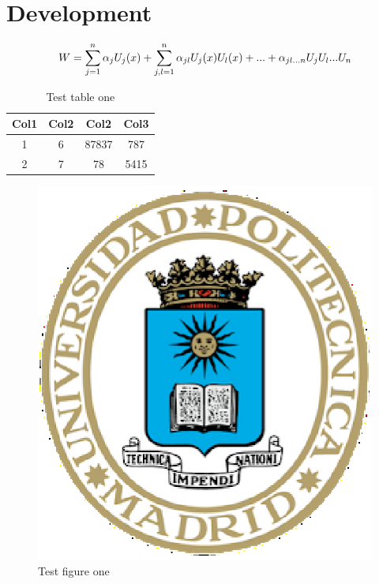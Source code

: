 \section{Development}
    
    \vspace{0.3cm}
    \noindent
    \begin{equation}
        W = \sum_{j=1}^{n} \alpha_j U_j(x) + \sum_{j,l=1}^{n} \alpha_{jl} U_j(x) U_l(x) + ... + \alpha_{jl...n} U_j U_l ... U_n
        \label{equation:eq_one}
        \myequations{Test equation one}
    \end{equation}
    \vspace{0.3cm}
    
    \noindent
    \begin{table}[h!]
        \centering
        \begin{tabular}{||c c c c||} 
            \hline
            Col1 & Col2 & Col2 & Col3 \\ [0.5ex] 
            \hline\hline
            1 & 6 & 87837 & 787 \\ 
            \hline
            2 & 7 & 78 & 5415 \\
            \hline
        \end{tabular}
        
        \caption{Test table one}
        \label{table:table_one}
    \end{table}
    
    \noindent
    \begin{figure}[h!]
        \centering
        \includegraphics[scale=0.2]{images/UPM.eps}
        \caption{Test figure one}
        \label{graphic:figure_one}
    \end{figure}


